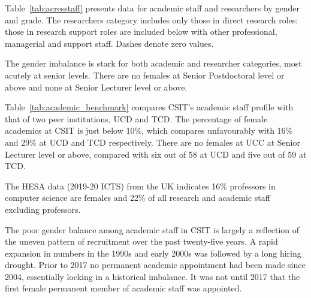 Table~\ref{tab:acresstaff} presents data for academic staff and researchers
by gender and grade. 
The researchers category includes only those in direct research roles:
those in research support roles are included below with other professional, 
managerial and support staff. Dashes denote zero values.




The gender imbalance is stark for both academic and researcher
categories, most acutely at senior levels. There are no females 
at Senior Postdoctoral level or above  and none at Senior Lecturer level or above. 


Table~\ref{tab:academic_benchmark} compares CSIT's academic
staff profile with that of two peer institutions, \ac{UCD} and \ac{TCD}.
The percentage of female academics at CSIT is just below 10\%, 
which compares unfavourably with 16\% and 29\% at UCD and TCD 
respectively. There are no females at UCC at Senior Lecturer
level or above, compared with six out of 58 at UCD and five 
out of 59 at TCD.





The \ac{HESA} data  (2019-20 ICTS) from the UK indicates 16\% professors in 
computer science are females and 22\% of all research and academic staff 
excluding professors.


The poor gender balance among academic staff in CSIT is largely 
a reflection of the uneven pattern of recruitment over the past 
twenty-five years. 
A rapid expansion in numbers in the 1990s and early 2000s was
followed by a long hiring drought. Prior to 2017 no permanent
academic appointment had been made since 2004, essentially 
locking in a historical imbalance. It was not until 2017 that
the first female permanent member of academic staff was appointed.

